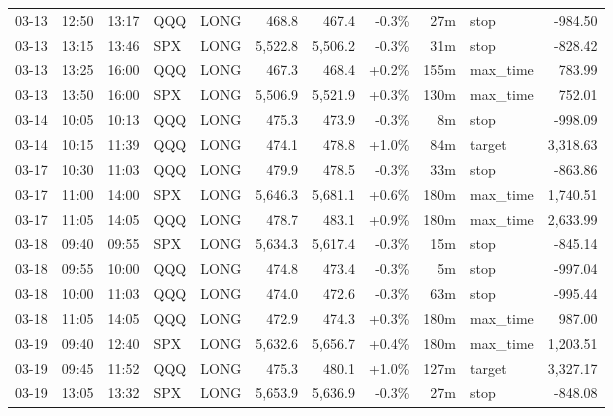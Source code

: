 \documentclass[11pt,a4paper,twoside]{article}
\begin{document}
\begin{center}
\begin{longtable}{>{\color{txtmain}}l l l l l r r r r >{\color{txtmain}}l r}
03-13 & 12:50 & 13:17 & QQQ & LONG & 468.8 & 467.4 & \textcolor{lossred}{-0.3\%} & 27m & stop & \textcolor{lossred}{-984.50} \\
03-13 & 13:15 & 13:46 & SPX & LONG & 5,522.8 & 5,506.2 & \textcolor{lossred}{-0.3\%} & 31m & stop & \textcolor{lossred}{-828.42} \\
03-13 & 13:25 & 16:00 & QQQ & LONG & 467.3 & 468.4 & \textcolor{wingreen}{+0.2\%} & 155m & max\_time & \textcolor{wingreen}{783.99} \\
03-13 & 13:50 & 16:00 & SPX & LONG & 5,506.9 & 5,521.9 & \textcolor{wingreen}{+0.3\%} & 130m & max\_time & \textcolor{wingreen}{752.01} \\
03-14 & 10:05 & 10:13 & QQQ & LONG & 475.3 & 473.9 & \textcolor{lossred}{-0.3\%} & 8m & stop & \textcolor{lossred}{-998.09} \\
03-14 & 10:15 & 11:39 & QQQ & LONG & 474.1 & 478.8 & \textcolor{wingreen}{+1.0\%} & 84m & target & \textcolor{wingreen}{3,318.63} \\
03-17 & 10:30 & 11:03 & QQQ & LONG & 479.9 & 478.5 & \textcolor{lossred}{-0.3\%} & 33m & stop & \textcolor{lossred}{-863.86} \\
03-17 & 11:00 & 14:00 & SPX & LONG & 5,646.3 & 5,681.1 & \textcolor{wingreen}{+0.6\%} & 180m & max\_time & \textcolor{wingreen}{1,740.51} \\
03-17 & 11:05 & 14:05 & QQQ & LONG & 478.7 & 483.1 & \textcolor{wingreen}{+0.9\%} & 180m & max\_time & \textcolor{wingreen}{2,633.99} \\
03-18 & 09:40 & 09:55 & SPX & LONG & 5,634.3 & 5,617.4 & \textcolor{lossred}{-0.3\%} & 15m & stop & \textcolor{lossred}{-845.14} \\
03-18 & 09:55 & 10:00 & QQQ & LONG & 474.8 & 473.4 & \textcolor{lossred}{-0.3\%} & 5m & stop & \textcolor{lossred}{-997.04} \\
03-18 & 10:00 & 11:03 & QQQ & LONG & 474.0 & 472.6 & \textcolor{lossred}{-0.3\%} & 63m & stop & \textcolor{lossred}{-995.44} \\
03-18 & 11:05 & 14:05 & QQQ & LONG & 472.9 & 474.3 & \textcolor{wingreen}{+0.3\%} & 180m & max\_time & \textcolor{wingreen}{987.00} \\
03-19 & 09:40 & 12:40 & SPX & LONG & 5,632.6 & 5,656.7 & \textcolor{wingreen}{+0.4\%} & 180m & max\_time & \textcolor{wingreen}{1,203.51} \\
03-19 & 09:45 & 11:52 & QQQ & LONG & 475.3 & 480.1 & \textcolor{wingreen}{+1.0\%} & 127m & target & \textcolor{wingreen}{3,327.17} \\
03-19 & 13:05 & 13:32 & SPX & LONG & 5,653.9 & 5,636.9 & \textcolor{lossred}{-0.3\%} & 27m & stop & \textcolor{lossred}{-848.08} \\

\end{longtable}
\end{center}
\end{document}

